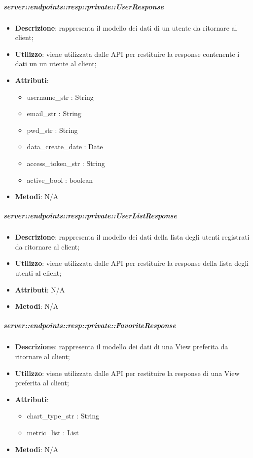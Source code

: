     \subparagraph{server::endpoints::resp::private::UserResponse} %
    \label{subp:bdsm_app_server_endpoints_resp_private_userresponse}
    \begin{itemize}
      \item \textbf{Descrizione}: rappresenta il modello dei dati di un utente da ritornare al client;
      \item \textbf{Utilizzo}: viene utilizzata dalle API per restituire la response contenente i dati un un utente al client;
	  \item \textbf{Attributi}:  
	  	\begin{itemize}
	  		\item username\_str : String
	  		\item email\_str : String
	  		\item pwd\_str : String
	  		\item data\_create\_date : Date
	  		\item access\_token\_str : String
	  		\item active\_bool : boolean
	  	\end{itemize}
	  \item \textbf{Metodi}: N/A
    \end{itemize}
    
    \subparagraph{server::endpoints::resp::private::UserListResponse} %
    \label{subp:bdsm_app_server_endpoints_resp_private_userlistresponse}
    \begin{itemize}
      \item \textbf{Descrizione}: rappresenta il modello dei dati della lista degli utenti registrati da ritornare al client;
      \item \textbf{Utilizzo}: viene utilizzata dalle API per restituire la response della lista degli utenti al client;
	  \item \textbf{Attributi}: N/A
	  \item \textbf{Metodi}: N/A
    \end{itemize}

    \subparagraph{server::endpoints::resp::private::FavoriteResponse} %
    \label{subp:bdsm_app_server_endpoints_resp_private_favoriteresponse}
    \begin{itemize}
      \item \textbf{Descrizione}: rappresenta il modello dei dati di una View preferita da ritornare al client;
      \item \textbf{Utilizzo}: viene utilizzata dalle API per restituire la response di una View preferita al client;
	  \item \textbf{Attributi}:  
	  	\begin{itemize}
	  		\item chart\_type\_str : String
	  		\item metric\_list : List
	  	\end{itemize}
	  \item \textbf{Metodi}: N/A
    \end{itemize}

